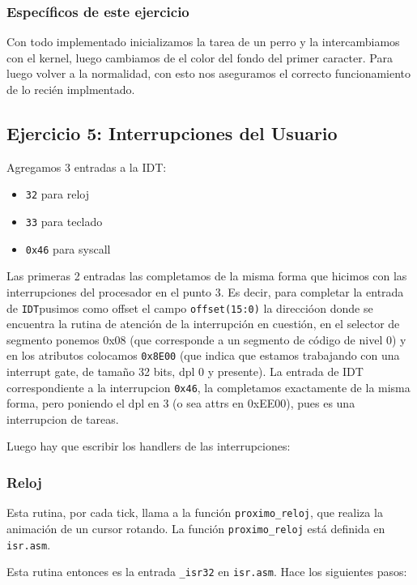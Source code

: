 \documentclass[twocolumn,10pt]{article}
\newcommand{\IDT}{\texttt{IDT}}
\begin{document}
\subsubsection*{Específicos de este ejercicio}

Con todo implementado inicializamos la tarea de un perro y la
intercambiamos con el kernel, luego cambiamos de el color del fondo
del primer caracter. Para luego volver a la normalidad, con esto nos
aseguramos el correcto funcionamiento de lo recién implmentado.


\subsection{Ejercicio 5: Interrupciones del Usuario}

Agregamos 3 entradas a la IDT:

\begin{itemize} 
\item \texttt{32} para reloj
\item \texttt{33} para teclado
\item \texttt{0x46} para syscall
\end{itemize}

Las primeras 2 entradas las completamos de la misma forma que hicimos
con las interrupciones del procesador en el punto 3. Es decir, para
completar la entrada de \IDT pusimos como offset el campo
\texttt{offset(15:0)} la direccióon donde se encuentra la rutina de
atención de la interrupción en cuestión, en el selector de segmento
ponemos 0x08 (que corresponde a un segmento de código de nivel 0) y en
los atributos colocamos \texttt{0x8E00} (que indica que estamos
trabajando con una interrupt gate, de tamaño 32 bits, dpl 0 y
presente). La entrada de IDT correspondiente a la interrupcion \texttt{0x46},
la completamos exactamente de la misma forma, pero poniendo el dpl en
3 (o sea attrs en 0xEE00), pues es una interrupcion de tareas.

Luego hay que escribir los handlers de las interrupciones: 

\subsubsection{Reloj}

Esta rutina, por cada tick, llama a la función
\texttt{proximo\_reloj}, que realiza la animación de un cursor
rotando. La función \texttt{proximo\_reloj} está definida en
\texttt{isr.asm}.

Esta rutina entonces es la entrada \texttt{\_isr32} en
\texttt{isr.asm}. Hace los siguientes pasos:
\end{document}
